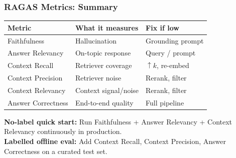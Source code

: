 \begin{frame}[fragile]\frametitle{RAGAS Metrics: Summary}

\begin{center}
\small
\begin{tabular}{|p{2cm}|p{2.5cm}|p{2.5cm}|}
\hline
\textbf{Metric} & \textbf{What it measures} &  \textbf{Fix if low} \\
\hline
Faithfulness       & Hallucination          & Grounding prompt \\
Answer Relevancy   & On-topic response      & Query / prompt \\
Context Recall     & Retriever coverage     & $\uparrow k$, re-embed \\
Context Precision  & Retriever noise        & Rerank, filter \\
Context Relevancy  & Context signal/noise   & Rerank, filter \\
Answer Correctness & End-to-end quality     & Full pipeline \\
\hline
\end{tabular}
\end{center}

\vspace{0.3em}
{\small
\textbf{No-label quick start:} Run Faithfulness + Answer Relevancy + Context Relevancy continuously in production.\\
\textbf{Labelled offline eval:} Add Context Recall, Context Precision, Answer Correctness on a curated test set.}

\end{frame}
